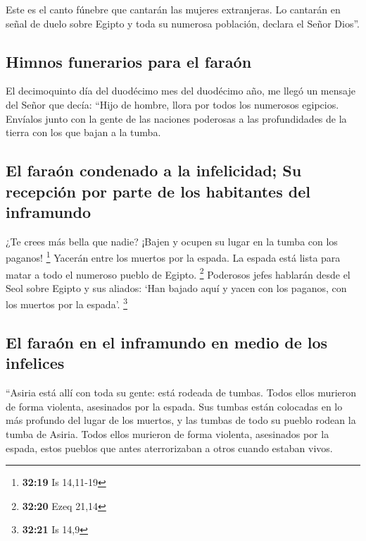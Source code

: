  Este es el canto fúnebre que cantarán las mujeres
extranjeras. Lo cantarán en señal de duelo sobre Egipto y toda su
numerosa población, declara el Señor Dios''.

\hypertarget{himnos-funerarios-para-el-farauxf3n}{%
\subsection{Himnos funerarios para el
faraón}\label{himnos-funerarios-para-el-farauxf3n}}

 El decimoquinto día del duodécimo mes del duodécimo año,
me llegó un mensaje del Señor que decía:  ``Hijo de
hombre, llora por todos los numerosos egipcios. Envíalos junto con la
gente de las naciones poderosas a las profundidades de la tierra con los
que bajan a la tumba.

\hypertarget{el-farauxf3n-condenado-a-la-infelicidad-su-recepciuxf3n-por-parte-de-los-habitantes-del-inframundo}{%
\subsection{El faraón condenado a la infelicidad; Su recepción por parte
de los habitantes del
inframundo}\label{el-farauxf3n-condenado-a-la-infelicidad-su-recepciuxf3n-por-parte-de-los-habitantes-del-inframundo}}

 ¿Te crees más bella que nadie? ¡Bajen y ocupen su lugar
en la tumba con los paganos! \footnote{\textbf{32:19} Is 14,11-19}
 Yacerán entre los muertos por la espada. La espada está
lista para matar a todo el numeroso pueblo de Egipto. \footnote{\textbf{32:20}
  Ezeq 21,14}  Poderosos jefes hablarán desde el Seol
sobre Egipto y sus aliados: `Han bajado aquí y yacen con los paganos,
con los muertos por la espada'. \footnote{\textbf{32:21} Is 14,9}

\hypertarget{el-farauxf3n-en-el-inframundo-en-medio-de-los-infelices}{%
\subsection{El faraón en el inframundo en medio de los
infelices}\label{el-farauxf3n-en-el-inframundo-en-medio-de-los-infelices}}

 ``Asiria está allí con toda su gente: está rodeada de
tumbas. Todos ellos murieron de forma violenta, asesinados por la
espada.  Sus tumbas están colocadas en lo más profundo
del lugar de los muertos, y las tumbas de todo su pueblo rodean la tumba
de Asiria. Todos ellos murieron de forma violenta, asesinados por la
espada, estos pueblos que antes aterrorizaban a otros cuando estaban
vivos.

